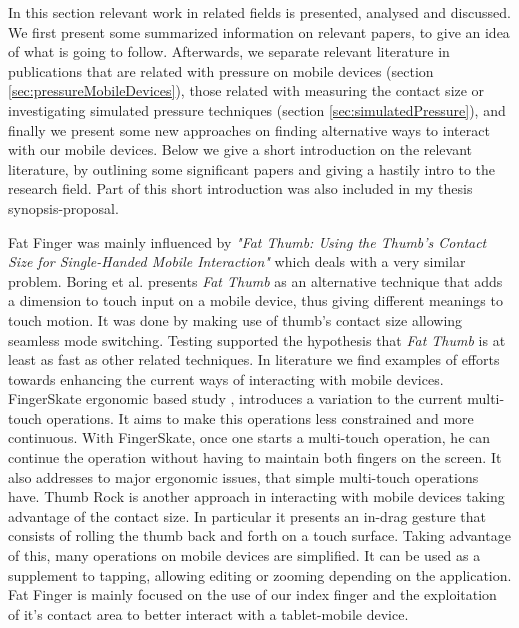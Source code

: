 
In this section relevant work in related fields is presented, analysed and discussed. We first present some summarized information on relevant papers,  to give an idea of what is going to follow. Afterwards, we separate relevant literature in publications that are related with pressure on mobile devices (section \ref{sec:pressureMobileDevices}), those related with measuring the contact size or investigating simulated pressure techniques (section \ref{sec:simulatedPressure}), and finally we present some new approaches on finding alternative ways to interact with our mobile devices.
Below we give a short introduction on the relevant literature, by outlining some significant papers and giving a hastily intro to the research field. Part of this short introduction was also included in my thesis synopsis-proposal.

Fat Finger was mainly influenced by \emph{"Fat Thumb: Using the Thumb's Contact Size for Single-Handed Mobile Interaction"} \cite{Boring:2012:FTU:2371574.2371582} which deals with a very similar problem. Boring et al. presents \emph{Fat Thumb} as an alternative technique that adds a dimension to touch input on a mobile device, thus giving different meanings to touch motion. It was done by making use of thumb's contact size allowing seamless mode switching. Testing supported the hypothesis that \emph{Fat Thumb} is at least as fast as other related techniques.
In literature we find examples of efforts towards enhancing the current ways of interacting with mobile devices.
FingerSkate ergonomic based study \cite{Son:2013:FMM:2508468.2514733}, introduces a variation to the current multi-touch operations. It aims to make this operations less constrained and more continuous. With FingerSkate, once one starts a multi-touch operation, he can continue the operation without having to maintain both fingers on the screen. It also addresses to major ergonomic issues, that simple multi-touch operations have.
Thumb Rock \cite{Bonnet2013} is another approach in interacting with mobile devices taking advantage of the contact size. In particular it presents an in-drag gesture that consists of rolling the thumb back and forth on a touch surface. Taking advantage of this, many operations on mobile devices are simplified. It can be used as a supplement to tapping, allowing editing or zooming depending on the application. 
Fat Finger is mainly focused on the use of our index finger and the exploitation of it's contact area to better interact with a tablet-mobile device.  

